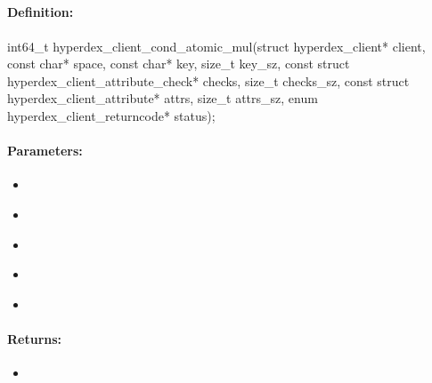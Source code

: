 \pagebreak
\subsection{}
\label{api:c:cond_atomic_mul}


\paragraph{Definition:}
\begin{ccode}
int64_t hyperdex_client_cond_atomic_mul(struct hyperdex_client* client,
        const char* space,
        const char* key, size_t key_sz,
        const struct hyperdex_client_attribute_check* checks, size_t checks_sz,
        const struct hyperdex_client_attribute* attrs, size_t attrs_sz,
        enum hyperdex_client_returncode* status);
\end{ccode}

\paragraph{Parameters:}
\begin{itemize}[noitemsep]
\item {}\\

\item {}\\

\item {}\\

\item {}\\

\item {}\\

\end{itemize}

\paragraph{Returns:}
\begin{itemize}[noitemsep]
\item {}\\

\end{itemize}

